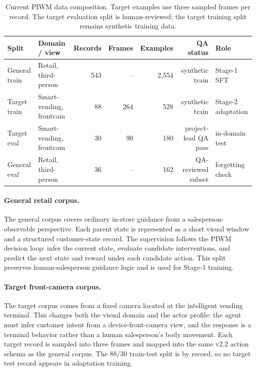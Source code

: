 \begin{table}[t]
\centering
\small
\begin{tabular}{llrrrrl}
\toprule
Split & Domain / view & Records & Frames & Examples & QA status & Role \\
\midrule
General train & Retail, third-person & 543 & -- & 2,554 & synthetic train & Stage-1 SFT \\
Target train & Smart-vending, frontcam & 88 & 264 & 528 & synthetic train & Stage-2 adaptation \\
Target eval & Smart-vending, frontcam & 30 & 90 & 180 & project-lead QA pass & in-domain test \\
General eval & Retail, third-person & 36 & -- & 162 & QA-reviewed subset & forgetting check \\
\bottomrule
\end{tabular}
\caption{Current PIWM data composition. Target examples use three sampled frames per record. The target evaluation split is human-reviewed; the target training split remains synthetic training data.}
\label{tab:data-composition}
\end{table}

\paragraph{General retail corpus.}
The general corpus covers ordinary in-store guidance from a salesperson-observable perspective. Each parent state is represented as a short visual window and a structured customer-state record. The supervision follows the PIWM decision loop: infer the current state, evaluate candidate interventions, and predict the next state and reward under each candidate action. This split preserves human-salesperson guidance logic and is used for Stage-1 training.

\paragraph{Target front-camera corpus.}
The target corpus comes from a fixed camera located at the intelligent vending terminal. This changes both the visual domain and the actor profile: the agent must infer customer intent from a device-front-camera view, and the response is a terminal behavior rather than a human salesperson's body movement. Each target record is sampled into three frames and mapped into the same v2.2 action schema as the general corpus. The 88/30 train-test split is by record, so no target test record appears in adaptation training.

